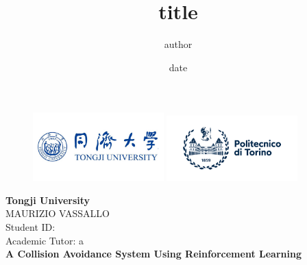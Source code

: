 \documentclass[14pt]{extarticle}
\def\ss{\vspace{25pt}}
\begin{document}
\title{title}
\author{author}
\date{date}

\begin{titlepage}
	\begin{figure}[t]
    		\centering\includegraphics[width=0.45\textwidth]{./Image/tongji-university1.png}
    		\centering\includegraphics[width=0.45\textwidth]{./Image/polito_logo_2021_blu_resized.png}
		\vspace{10mm}
	\end{figure}

	\begin{center}
	    	\textbf{ \LARGE{Tongji University\\}}
		\ss
		\textnormal{ \Large {MAURIZIO VASSALLO\\}}
		\textnormal{ \large {Student ID: \\}}
		\textnormal{ \large {Academic Tutor: a\\}}
	    		\vspace{\fill}\textbf{\LARGE{A Collision Avoidance System Using
Reinforcement Learning\\}}\vspace*{\fill}%
	\end{center}
	
\end{titlepage}

\tableofcontents
\newpage
\end{document}
